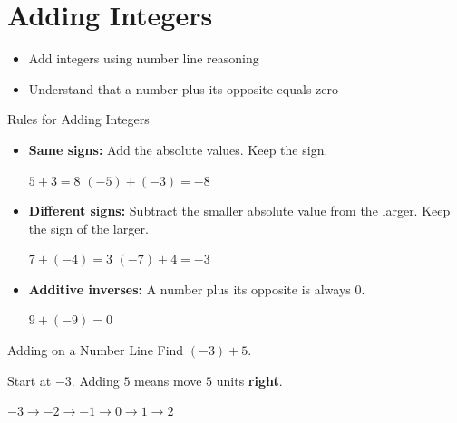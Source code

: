 \section{Adding Integers}

\begin{learningGoals}
\begin{itemize}
    \item Add integers using number line reasoning
    \item Understand that a number plus its opposite equals zero
\end{itemize}
\end{learningGoals}

\begin{conceptBox}{Rules for Adding Integers}
\begin{itemize}[leftmargin=*]
    \item \textbf{Same signs:} Add the absolute values. Keep the sign.
    
    $5 + 3 = 8$ \qquad $(-5) + (-3) = -8$
    \item \textbf{Different signs:} Subtract the smaller absolute value from the larger. Keep the sign of the larger.
    
    $7 + (-4) = 3$ \qquad $(-7) + 4 = -3$
    \item \textbf{Additive inverses:} A number plus its opposite is always $0$.
    
    $9 + (-9) = 0$
\end{itemize}
\end{conceptBox}

\begin{workedExample}{Adding on a Number Line}
Find $(-3) + 5$.

Start at $-3$. Adding $5$ means move $5$ units \textbf{right}.

$-3 \to -2 \to -1 \to 0 \to 1 \to 2$

\end{workedExample}


